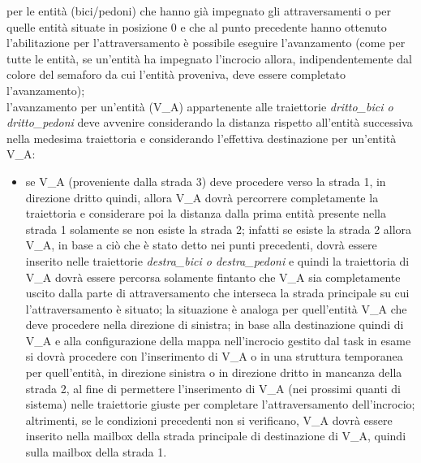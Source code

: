 \begin{enumerate}
\begin{enumerate}
per le entità (bici/pedoni) che hanno già impegnato gli attraversamenti o per quelle entità situate in posizione 0 e che al punto precedente hanno ottenuto l'abilitazione per l'attraversamento è possibile eseguire l'avanzamento (come per tutte le entità, se un'entità ha impegnato l'incrocio allora, indipendentemente dal colore del semaforo da cui l'entità proveniva, deve essere completato l'avanzamento); \\
l'avanzamento per un'entità (V\_A) appartenente alle traiettorie \textit{drit\-to\_bi\-ci o drit\-to\_pe\-do\-ni} deve avvenire considerando la distanza rispetto all'entità successiva nella medesima traiettoria e considerando l'effettiva destinazione per un'entità V\_A:
\begin{itemize}
\item se V\_A (proveniente dalla strada 3) deve procedere verso la strada 1, in direzione dritto quindi, allora V\_A dovrà percorrere completamente la traiettoria e considerare poi la distanza dalla prima entità presente nella strada 1 solamente se non esiste la strada 2; infatti se esiste la strada 2 allora V\_A, in base a ciò che è stato detto nei punti precedenti, dovrà essere inserito nelle traiettorie \textit{des\-tra\_bi\-ci o des\-tra\_pe\-do\-ni} e quindi la traiettoria di V\_A dovrà essere percorsa solamente fintanto che V\_A sia completamente uscito dalla parte di attraversamento che interseca la strada principale su cui l'attraversamento è situato; la situazione è analoga per quell'entità V\_A che deve procedere nella direzione di sinistra; in base alla destinazione quindi di V\_A e alla configurazione della mappa nell'incrocio gestito dal task in esame si dovrà procedere con l'inserimento di V\_A o in una struttura temporanea per quell'entità, in direzione sinistra o in direzione dritto in mancanza della strada 2, al fine di permettere l'inserimento di V\_A (nei prossimi quanti di sistema) nelle traiettorie giuste per completare l'attraversamento dell'incrocio; altrimenti, se le condizioni precedenti non si verificano, V\_A dovrà essere inserito nella mailbox della strada principale di destinazione di V\_A, quindi sulla mailbox della strada 1.
\end{itemize}
\end{enumerate}
\end{enumerate}

